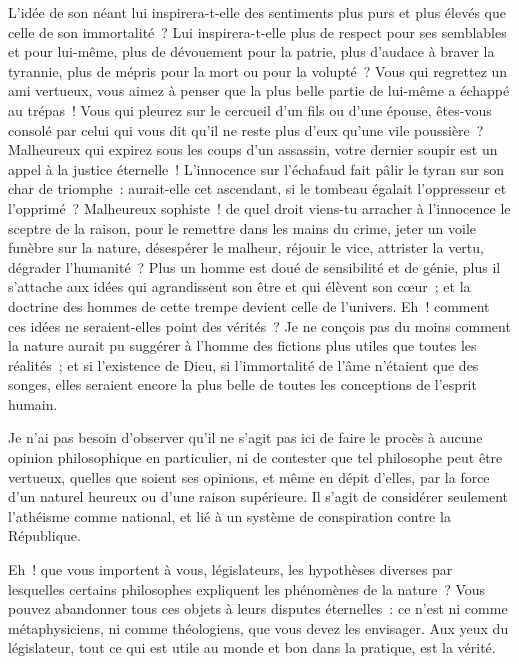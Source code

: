 \documentclass[french,twoside]{book} %
\begin{document}
L’idée de son néant lui inspirera-t-elle des sentiments plus purs et plus élevés que celle de son immortalité ? Lui inspirera-t-elle plus de respect pour ses semblables et pour lui-même, plus de dévouement pour la patrie, plus d’audace à braver la tyrannie, plus de mépris pour la mort ou pour la volupté ? Vous qui regrettez un ami vertueux, vous aimez à penser que la plus belle partie de lui-même a échappé au trépas ! Vous qui pleurez sur le cercueil d’un fils ou d’une épouse, êtes-vous consolé par celui qui vous dit qu’il ne reste plus d’eux qu’une vile poussière ? Malheureux qui expirez sous les coups d’un assassin, votre dernier soupir est un appel à la justice éternelle ! L’innocence sur l’échafaud fait pâlir le tyran sur son char de triomphe : aurait-elle cet ascendant, si le tombeau égalait l’oppresseur et l’opprimé ? Malheureux sophiste ! de quel droit viens-tu arracher à l’innocence le sceptre de la raison, pour le remettre dans les mains du crime, jeter un voile funèbre sur la nature, désespérer le malheur, réjouir le vice, attrister la vertu, dégrader l’humanité ? Plus un homme est doué de sensibilité et de génie, plus il s’attache aux idées qui agrandissent son être et qui élèvent son cœur ; et la doctrine des hommes de cette trempe devient celle de l’univers. Eh ! comment ces idées ne seraient-elles point des vérités ? Je ne conçois pas du moins comment la nature aurait pu suggérer à l’homme des fictions plus utiles que toutes les réalités ; et si l’existence de Dieu, si l’immortalité de l’âme n’étaient que des songes, elles seraient encore la plus belle de toutes les conceptions de l’esprit humain.\par
Je n’ai pas besoin d’observer qu’il ne s’agit pas ici de faire le procès à aucune opinion philosophique en particulier, ni de contester que tel philosophe peut être vertueux, quelles que soient ses opinions, et même en dépit d’elles, par la force d’un naturel heureux ou d’une raison supérieure. Il s’agit de considérer seulement l’athéisme comme national, et lié à un système de conspiration contre la République.\par
Eh ! que vous importent à vous, législateurs, les hypothèses diverses par lesquelles certains philosophes expliquent les phénomènes de la nature ? Vous pouvez abandonner tous ces objets à leurs disputes éternelles : ce n’est ni comme métaphysiciens, ni comme théologiens, que vous devez les envisager. Aux yeux du législateur, tout ce qui est utile au monde et bon dans la pratique, est la vérité.\par
\end{document}
